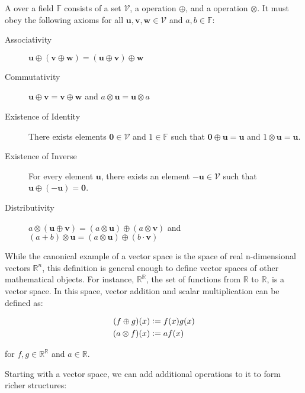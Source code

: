 \begin{definition}
A  over a field $\mathbb{F}$ consists of a set $\mathcal{V}$, a  operation $\oplus$, and a  operation $\otimes$. It must obey the following axioms for all $\mathbf{u}, \mathbf{v}, \mathbf{w} \in \mathcal{V}$ and $a, b \in \mathbb{F}$:
\begin{description}
  \item[Associativity] $\mathbf{u} \oplus (\mathbf{v} \oplus \mathbf{w}) = (\mathbf{u} \oplus \mathbf{v}) \oplus \mathbf{w}$
  \item[Commutativity] $\mathbf{u} \oplus \mathbf{v} = \mathbf{v} \oplus \mathbf{w}$ and $a \otimes \mathbf{u} = \mathbf{u} \otimes a$
  \item[Existence of Identity] There exists elements $\mathbf{0} \in \mathcal{V}$ and $1 \in \mathbb{F}$ such that $\mathbf{0} \oplus \mathbf{u} = \mathbf{u}$ and $1 \otimes \mathbf{u} = \mathbf{u}$.
  \item[Existence of Inverse] For every element $\mathbf{u}$, there exists an element $-\mathbf{u} \in \mathcal{V}$ such that $\mathbf{u} \oplus (-\mathbf{u}) = \mathbf{0}$.
  \item[Distributivity] $a \otimes (\mathbf{u} \oplus \mathbf{v}) = (a \otimes \mathbf{u}) \oplus (a \otimes \mathbf{v})$ and $(a + b) \otimes \mathbf{u} = (a \otimes \mathbf{u}) \oplus (b \cdot \mathbf{v})$
\end{description}
\end{definition}

While the canonical example of a vector space is the space of real n-dimensional vectors $\mathbb{R}^n$, this definition is general enough to define vector spaces of other mathematical objects. For instance, $\mathbb{R}^\mathbb{R}$, the set of functions from $\mathbb{R}$ to $\mathbb{R}$, is a vector space. In this space, vector addition and scalar multiplication can be defined as:

\begin{align}
  (f \oplus g)(x) &\vcentcolon= f(x) g(x) \\
  (a \otimes f)(x) &\vcentcolon= a f(x)
\end{align}

for $f, g \in \mathbb{R}^\mathbb{R}$ and $a \in \mathbb{R}$.

Starting with a vector space, we can add additional operations to it to form richer structures:


